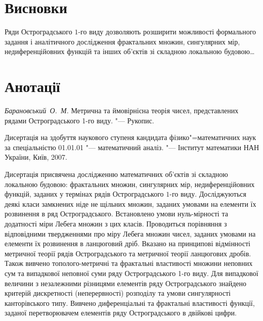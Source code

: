\documentclass{vakaref}
\theoremstyle{plain}
\theoremstyle{definition}
\theoremstyle{remark}
\begin{document}
\part{Висновки}

Ряди Остроградського $1$-го виду дозволяють розширити можливості
формального задання і аналітичного дослідження фрактальних множин,
сингулярних мір, недиференційовних функцій та інших об'єктів зі
складною локальною будовою\ldots





\part{Анотації}

\emph{Барановський~О.~М.} Метрична та ймовірнісна теорія чисел,
представлених рядами Остроградського 1-го виду. "--- Рукопис.

Дисертація на здобуття наукового ступеня кандидата
фізико"=математичних наук за спеціальністю 01.01.01 "---
математичний аналіз. "--- Інститут математики НАН України, Київ,
2007.

\smallskip

Дисертація присвячена дослідженню математичних об'єктів зі
\linebreak складною локальною будовою: фрактальних множин,
сингулярних мір, недиференційовних функцій, заданих у термінах
рядів Остроградського $1$-го виду. Досліджуються деякі класи
замкнених ніде не щільних множин, заданих умовами на елементи їх
розвинення в ряд Остроградського. Встановлено умови нуль-мірності
та додатності міри Лебега множин з цих класів. Проводиться
порівняння з відповідними твердженнями про міру Лебега множин
чисел, заданих умовами на елементи їх розвинення в ланцюговий
дріб. Вказано на принципові відмінності метричної теорії рядів
Остроградського та метричної теорії ланцюгових дробів. Також
вивчено тополого-метричні та фрактальні властивості множини
неповних сум та випадкової неповної суми ряду Остроградського 1-го
виду. Для випадкової величини з незалежними різницями елементів
ряду Остроградського знайдено критерій дискретності
(неперервності) розподілу та умови сингулярності канторівського
типу. Вивчено диференціальні та фрактальні властивості функції,
заданої перетворювачем елементів ряду Остроградського в двійкові
цифри.
\end{document}
